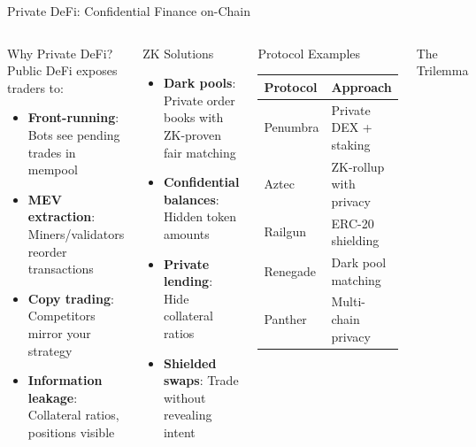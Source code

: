 \documentclass[8pt,aspectratio=169]{beamer}
\begin{document}
\begin{frame}{Private DeFi: Confidential Finance on-Chain}
\begin{columns}[T]
\begin{block}{\footnotesize Why Private DeFi?}
\footnotesize
Public DeFi exposes traders to:
\begin{itemize}
\item \textbf{Front-running}: Bots see pending trades in mempool
\item \textbf{MEV extraction}: Miners/validators reorder transactions
\item \textbf{Copy trading}: Competitors mirror your strategy
\item \textbf{Information leakage}: Collateral ratios, positions visible
\end{itemize}
\end{block}
\vspace{0.1cm}
\begin{exampleblock}{\footnotesize ZK Solutions}
\footnotesize
\begin{itemize}
\item \textbf{Dark pools}: Private order books with ZK-proven fair matching
\item \textbf{Confidential balances}: Hidden token amounts
\item \textbf{Private lending}: Hide collateral ratios
\item \textbf{Shielded swaps}: Trade without revealing intent
\end{itemize}
\end{exampleblock}
\begin{block}{\footnotesize Protocol Examples}
\footnotesize
\begin{tabular}{l l}
\toprule
\textbf{Protocol} & \textbf{Approach} \\
\midrule
Penumbra & Private DEX + staking \\
Aztec & ZK-rollup with privacy \\
Railgun & ERC-20 shielding \\
Renegade & Dark pool matching \\
Panther & Multi-chain privacy \\
\bottomrule
\end{tabular}
\end{block}
\vspace{0.2cm}
\begin{alertblock}{\footnotesize The Trilemma}
\footnotesize
\begin{center}

\end{center}
\end{alertblock}
\end{columns}
\end{frame}
\end{document}
